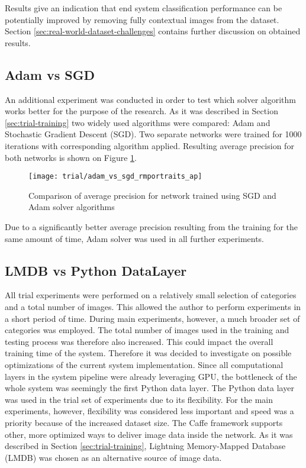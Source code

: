     
    Results give an indication that end system classification performance can be potentially improved by removing fully contextual images from the dataset. Section \ref{sec:real-world-dataset-challenges} contains further discussion on obtained results.

    
\subsection{Adam vs SGD}
    An additional experiment was conducted in order to test which solver algorithm works better for the purpose of the research. As it was described in Section \ref{sec:trial-training} two widely used algorithms were compared: Adam and Stochastic Gradient Descent (SGD). Two separate networks were trained for 1000 iterations with corresponding algorithm applied. Resulting average precision for both networks is shown on Figure \ref{fig:trial-sgd-vs-adam}.

    \begin{figure}[H]
        \centering
        \texttt{[image: trial/adam\_vs\_sgd\_rmportraits\_ap]}
        \caption[Trial experiment. Average precision for Adam vs SGD solvers]{Comparison of average precision for network trained using SGD and Adam solver algorithms}
        \label{fig:trial-sgd-vs-adam}
    \end{figure}
    
    Due to a significantly better average precision resulting from the training for the same amount of time, Adam solver was used in all further experiments.
    
    
\subsection{LMDB vs Python DataLayer}
    All trial experiments were performed on a relatively small selection of categories and a total number of images. This allowed the author to perform experiments in a short period of time. During main experiments, however, a much broader set of categories was employed. The total number of images used in the training and testing process was therefore also increased. This could impact the overall training time of the system. Therefore it was decided to investigate on possible optimizations of the current system implementation. Since all computational layers in the system pipeline were already leveraging GPU, the bottleneck of the whole system was seemingly the first Python data layer. The Python data layer was used in the trial set of experiments due to its flexibility. For the main experiments, however, flexibility was considered less important and speed was a priority because of the increased dataset size. The Caffe framework supports other, more optimized ways to deliver image data inside the network. As it was described in Section \ref{sec:trial-training}, Lightning Memory-Mapped Database (LMDB) was chosen as an alternative source of image data.
    
